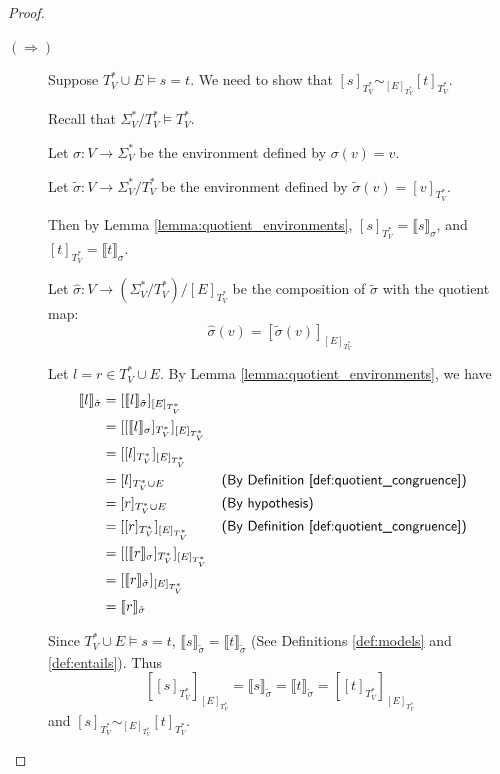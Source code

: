 \documentclass{msthesis}
\theoremstyle{definition}
\newcommand{\semof}[1]{\llbracket{#1}\rrbracket}
\begin{document}
\newcommand{\RA}{\Rightarrow}
\newcommand{\LA}{\Leftarrow}
\begin{proof}
\begin{description}
\item[$(\RA)$]
    Suppose $T^*_V \cup E \models s=t$.  We need to show that $[s]_{T^*_V} \sim_{[E]_{T^*_V}} [t]_{T^*_V}$.
    
    Recall that $\Sigma^*_V/T^*_V \models T^*_V$.


    Let $\sigma : V \to \Sigma^*_V$ be the environment defined by $\sigma(v) = v$.
    
    Let $\tilde{\sigma} : V \to \Sigma^*_V/T^*_V$ be the
    environment defined by $\tilde{\sigma}(v) = [v]_{T^*_V}$.

    Then by Lemma \ref{lemma:quotient_environments}, $[s]_{T^*_V} = \semof{s}_\sigma$, 
    and $[t]_{T^*_V} = \semof{t}_\sigma$.

    Let $\hat{\sigma} : V \to \left(\Sigma^*_V/T^*_V\right)/[E]_{T^*_V}$ 
    be the composition of $\tilde{\sigma}$ with the quotient map:
    \[ \hat \sigma(v) = [\tilde \sigma(v)]_{[E]_{T^*_V}}\]

    Let $l = r \in T^*_V \cup E$.  By Lemma \ref{lemma:quotient_environments}, we have
    \begin{align*}
        \semof{l}_{\hat \sigma} &=
        [\semof{l}_{\tilde \sigma}]_{[E]_{T^*_V}} \\
        &= [[\semof{l}_\sigma]_{T^*_V}]_{[E]_{T^*_V}} \\
        &= [[l]_{T^*_V}]_{[E]_{T^*_V}} \\
        &= [l]_{T^*_V \cup E} && \textsf{(By Definition \ref{def:quotient_congruence})}\\
        &= [r]_{T^*_V \cup E} && \textsf{(By hypothesis)}\\
        &= [[r]_{T^*_V}]_{[E]_{T^*_V}} && \textsf{(By Definition \ref{def:quotient_congruence})}\\
        &= [[\semof{r}_\sigma]_{T^*_V}]_{[E]_{T^*_V}} \\
        &= [\semof{r}_{\tilde \sigma}]_{[E]_{T^*_V}} \\
        &= \semof{r}_{\hat \sigma}
    \end{align*}

    Since $T^*_V \cup E \models s=t$, $\semof{s}_{\tilde \sigma}
    = \semof{t}_{\tilde \sigma}$ (See Definitions \ref{def:models} and \ref{def:entails}).  Thus 
    \[ [[s]_{T^*_V}]_{[E]_{T^*_V}} =
    \semof{s}_{\tilde \sigma}
    = \semof{t}_{\tilde \sigma}
    = [[t]_{T^*_V}]_{[E]_{T^*_V}}
    \]
    and $[s]_{T^*_V} \sim_{[E]_{T^*_V}} [t]_{T^*_V}$.


\end{description}
\end{proof}
\end{document}
